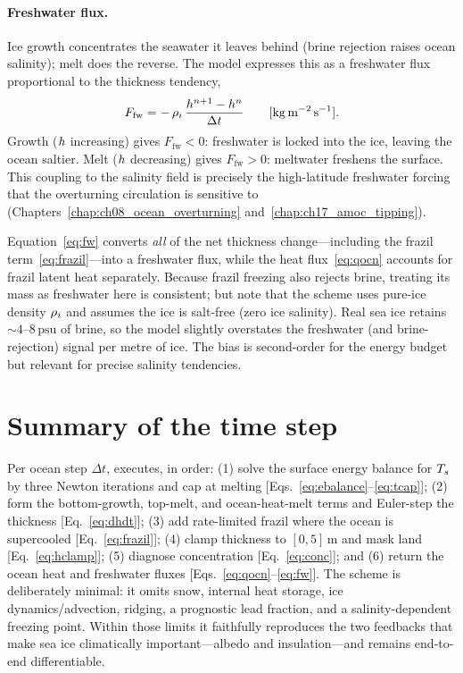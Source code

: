 \paragraph{Freshwater flux.} Ice growth concentrates the seawater it leaves
behind (brine rejection raises ocean salinity); melt does the reverse. The model
expresses this as a freshwater flux proportional to the thickness tendency,
\begin{equation}
  F_{\mathrm{fw}} = -\,\rho_{i}\,\frac{h^{n+1}-h^{n}}{\Delta t}
  \qquad [\mathrm{kg\,m^{-2}\,s^{-1}}].
  \label{eq:fw}
\end{equation}
Growth ($h$ increasing) gives $F_{\mathrm{fw}}<0$: freshwater is locked into
the ice, leaving the ocean saltier. Melt ($h$ decreasing) gives
$F_{\mathrm{fw}}>0$: meltwater freshens the surface. This coupling to the
salinity field is precisely the high-latitude freshwater forcing that the
overturning circulation is sensitive to
(Chapters~\ref{chap:ch08_ocean_overturning} and~\ref{chap:ch17_amoc_tipping}).

\begin{remark}
Equation~\eqref{eq:fw} converts \emph{all} of the net thickness change---including
the frazil term~\eqref{eq:frazil}---into a freshwater flux, while the heat
flux~\eqref{eq:qocn} accounts for frazil latent heat separately. Because frazil
freezing also rejects brine, treating its mass as freshwater here is consistent;
but note that the scheme uses pure-ice density $\rho_{i}$ and assumes the ice is
salt-free (zero ice salinity). Real sea ice retains $\sim 4$--$8\,\mathrm{psu}$
of brine, so the model slightly overstates the freshwater (and brine-rejection)
signal per metre of ice. The bias is second-order for the energy budget but
relevant for precise salinity tendencies.
\end{remark}

\section{Summary of the time step}

Per ocean step $\Delta t$,  executes, in order: (1) solve the
surface energy balance for $T_{s}$ by three Newton iterations and cap at melting
[Eqs.~\eqref{eq:ebalance}--\eqref{eq:tcap}]; (2) form the bottom-growth,
top-melt, and ocean-heat-melt terms and Euler-step the thickness
[Eq.~\eqref{eq:dhdt}]; (3) add rate-limited frazil where the ocean is supercooled
[Eq.~\eqref{eq:frazil}]; (4) clamp thickness to $[0,5]\,\mathrm{m}$ and mask land
[Eq.~\eqref{eq:hclamp}]; (5) diagnose concentration [Eq.~\eqref{eq:conc}]; and
(6) return the ocean heat and freshwater fluxes
[Eqs.~\eqref{eq:qocn}--\eqref{eq:fw}]. The scheme is deliberately minimal: it
omits snow, internal heat storage, ice dynamics/advection, ridging, a prognostic
lead fraction, and a salinity-dependent freezing point. Within those limits it
faithfully reproduces the two feedbacks that make sea ice climatically
important---albedo and insulation---and remains end-to-end differentiable.


